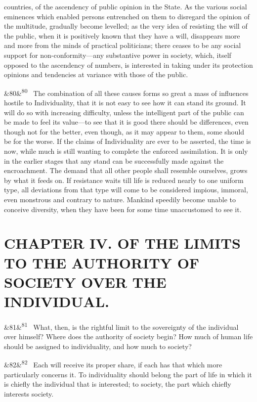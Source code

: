 \documentclass[12pt]{article}
\newcommand{\para}[1][]{\par\noindent\ifx&#1&\else\textsuperscript{\footnotesize #1}~\fi}
\begin{document}
countries, of the ascendency of public opinion in the State. As the various social eminences which enabled persons entrenched on them to disregard the opinion of the multitude, gradually become levelled; as the very idea of resisting the will of the public, when it is positively known that they have a will, disappears more and more from the minds of practical politicians; there ceases to be any social support for non-conformity---any substantive power in society, which, itself opposed to the ascendency of numbers, is interested in taking under its protection opinions and tendencies at variance with those of the public.

\para[80] The combination of all these causes forms so great a mass of influences hostile to Individuality, that it is not easy to see how it can stand its ground. It will do so with increasing difficulty, unless the intelligent part of the public can be made to feel its value---to see that it is good there should be differences, even though not for the better, even though, as it may appear to them, some should be for the worse. If the claims of Individuality are ever to be asserted, the time is now, while much is still wanting to complete the enforced assimilation. It is only in the earlier stages that any stand can be successfully made against the encroachment. The demand that all other people shall resemble ourselves, grows by what it feeds on. If resistance waits till life is reduced nearly to one uniform type, all deviations from that type will come to be considered impious, immoral, even monstrous and contrary to nature. Mankind speedily become unable to conceive diversity, when they have been for some time unaccustomed to see it.

\section*{CHAPTER IV. OF THE LIMITS TO THE AUTHORITY OF SOCIETY OVER THE INDIVIDUAL.}

\para[81] What, then, is the rightful limit to the sovereignty of the individual over himself? Where does the authority of society begin? How much of human life should be assigned to individuality, and how much to society?

\para[82] Each will receive its proper share, if each has that which more particularly concerns it. To individuality should belong the part of life in which it is chiefly the individual that is interested; to society, the part which chiefly interests society.
\end{document}
